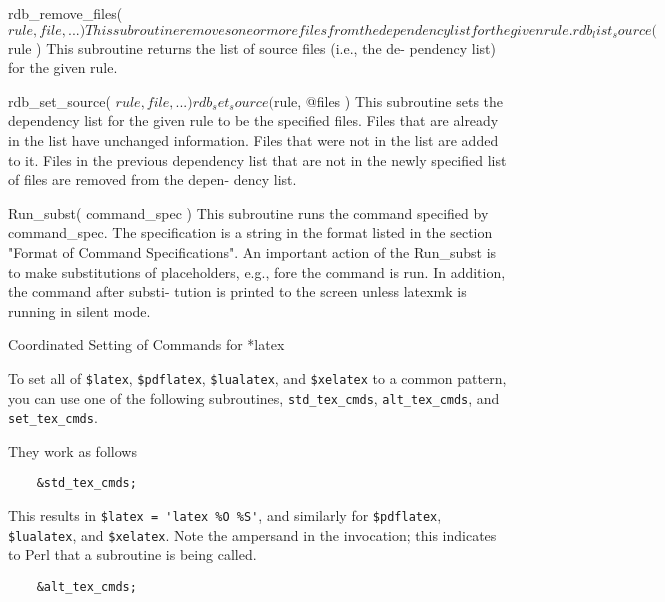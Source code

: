        rdb_remove_files( $rule, file, ... )
              This subroutine removes one or more files  from  the  dependency
              list for the given rule.

       rdb_list_source( $rule )
              This  subroutine returns the list of source files (i.e., the de-
              pendency list) for the given rule.

       rdb_set_source( $rule, file, ... )

       rdb_set_source( $rule, @files )
              This subroutine sets the dependency list for the given  rule  to
              be the specified files.  Files that are already in the list have
              unchanged information.  Files that were  not  in  the  list  are
              added to it.  Files in the previous dependency list that are not
              in the newly specified list of files are removed from the depen-
              dency list.

       Run_subst( command_spec )
              This subroutine runs the command specified by command_spec.  The
              specification is a string in the format listed  in  the  section
              "Format  of Command Specifications".  An important action of the
              Run_subst is to make substitutions of placeholders, e.g., %
              fore the command is run.  In addition, the command after substi-
              tution  is  printed  to  the screen unless latexmk is running in
              silent mode.


Coordinated Setting of Commands for *latex

To set all of \verb|$latex|, \verb|$pdflatex|, \verb|$lualatex|, and \verb|$xelatex|  to  a  common
pattern,  you  can  use one of the following subroutines, \verb|std_tex_cmds|,
\verb|alt_tex_cmds|, and \verb|set_tex_cmds|.

They work as follows

\begin{verbatim}
	&std_tex_cmds;
\end{verbatim}

This results in \verb|$latex = 'latex %O %S'|, and  similarly  for  \verb|$pdflatex|,
\verb|$lualatex|,  and  \verb|$xelatex|.   Note the ampersand in the invocation; this
indicates to Perl that a subroutine is being called.

\begin{verbatim}
	&alt_tex_cmds;
\end{verbatim}

